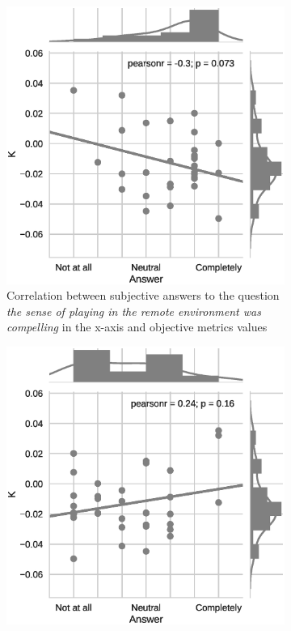 \begin{figure}[t]
	\centering
	\begin{subfigure}[t]{.49\columnwidth}
		\centering        
		\includegraphics[trim={0cm 0cm 1cm 0cm},clip,width=\textwidth]{img/compelling}
		\caption{Correlation between subjective answers to the question \textit{the sense of playing in the remote environment was compelling} in the x-axis and objective metrics values}
		\label{subfig:compelling}
	\end{subfigure}
	\quad
	\begin{subfigure}[t]{.43\columnwidth}
		\centering        
		\includegraphics[trim={3cm 0cm 0cm 0cm},clip,width=\textwidth]{img/involvement}

\end{subfigure}
\end{figure}
